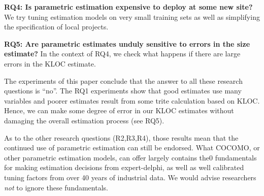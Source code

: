 \documentclass{sig-alternate}
\begin{document}
{\bf RQ4: Is parametric estimation expensive to deploy  at some new site?}
We try   tuning estimation models on very small training sets 
as well as simplifying the specification of local projects.

{\bf RQ5: Are parametric estimates unduly sensitive to errors in the size estimate?}
In the context of RQ4, we check what happens
if there are large errors in the KLOC estimate.

The experiments of this paper conclude that
the answer to all  these research questions is
``no''.  
The RQ1 experiments show that good estimates use many variables
and  poorer estimates result from   some trite calculation based on KLOC.   
Hence,  we can make some degree of
error in our KLOC estimates without damaging the overall estimation process (see RQ5).

As to the other research questions (R2,R3,R4), those results mean that 
the continued
use of parametric estimation can still be endorsed.
What COCOMO, or other parametric
estimation models, can offer largely contains the0
fundamentals for making estimation decisions
from expert-delphi, as well as well calibrated
tuning factors from over 40 years of
industrial data.  We would advise
researchers {\em not} to ignore these fundamentals.
\end{document}
